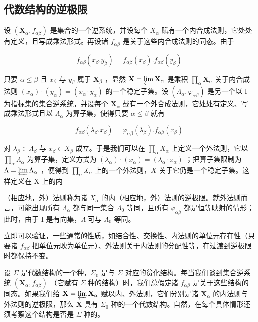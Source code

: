 \subsection{代数结构的逆极限}

设 \((\mathbf{X}_{\alpha}, f_{\alpha\beta})\) 是集合的一个逆系统，并设每个 \(X_{\alpha}\) 赋有一个内合成法则，它处处有定义，且写成乘法形式。再设诸 \(f_{\alpha\beta}\) 是关于这些内合成法则的同态。由于

\[
f _ {\alpha \beta} (x _ {\beta}. y _ {\beta}) = f _ {\alpha \beta} (x _ {\beta}). f _ {\alpha \beta} (y _ {\beta})
\]

只要 \(\alpha \leqslant \beta\) 且 \(x_{\beta}\) 与 \(y_{\beta}\) 属于 \(\mathbf{X}_{\beta}\) ，显然 \(\mathbf{X} = \varprojlim \mathbf{X}_{\alpha}\) 是乘积 \(\prod_{\alpha} \mathbf{X}_{\alpha}\) 关于内合成法则 \((x_{\alpha}) \cdot (y_{\alpha}) = (x_{\alpha} \cdot y_{\alpha})\) 的一个稳定子集。设 \((\Lambda_{\alpha}, \varphi_{\alpha\beta})\) 是另一个以 I 为指标集的集合逆系统，并设每个 \(\mathbf{X}_{\alpha}\) 载有一个外合成法则，它处处有定义、写成乘法形式且以 \(\Lambda_{\alpha}\) 为算子集，使得只要 \(\alpha \leqslant \beta\) 就有

\[
f _ {\alpha \beta} (\lambda_ {\beta}. x _ {\beta}) = \varphi_ {\alpha \beta} (\lambda_ {\beta}). f _ {\alpha \beta} (x _ {\beta})
\]

对 \(\lambda_{\beta} \in \Lambda_{\beta}\) 与 \(x_{\beta} \in X_{\beta}\) 成立。于是我们可以在 \(\prod_{\alpha} X_{\alpha}\) 上定义一个外法则，它以 \(\prod_{\alpha} \Lambda_{\alpha}\) 为算子集，定义方式为 \((\lambda_{\alpha}) \cdot (x_{\alpha}) = (\lambda_{\alpha} \cdot x_{\alpha})\) ；把算子集限制为 \(\Lambda = \varprojlim \Lambda_{\alpha}\) ，便得到 \(\prod_{\alpha} X_{\alpha}\) 上的一个外法则，\(X\) 关于它仍是一个稳定子集。这样定义在 X 上的内

（相应地，外）法则称为诸 \(X_{\alpha}\) 的内（相应地，外）法则的逆极限。就外法则而言，可能出现所有 \(\Lambda_{\alpha}\) 都与同一集合 \(\Lambda_{0}\) 等同，且所有 \(\varphi_{\alpha \beta}\) 都是恒等映射的情形；此时，由于 I 是有向集，\(\Lambda\) 可与 \(\Lambda_0\) 等同。

立即可以验证，一些通常的性质，如结合性、交换性、内法则的单位元存在性（只要诸 \(f_{\alpha\beta}\) 把单位元映为单位元）、外法则关于内法则的分配性等，在过渡到逆极限时都保持不变。

设 \(\Sigma\) 是代数结构的一个种，\(\Sigma_0\) 是与 \(\Sigma\) 对应的贫化结构。每当我们谈到集合逆系统 \((\mathbf{X}_{\alpha}, f_{\alpha\beta})\) （它赋有 \(\Sigma\) 种的结构）时，我们总假定诸 \(f_{\alpha\beta}\) 是关于这些结构的同态。如果我们给 \(\mathbf{X} = \varprojlim \mathbf{X}_{\alpha}\) 赋以内、外法则，它们分别是诸 \(\mathbf{X}_{\alpha}\) 的内法则与外法则的逆极限，那么 \(\mathbf{X}\) 具有 \(\Sigma_0\) 种的一个代数结构。自然，在每个具体情形还须考察这个结构是否是 \(\Sigma\) 种的。

